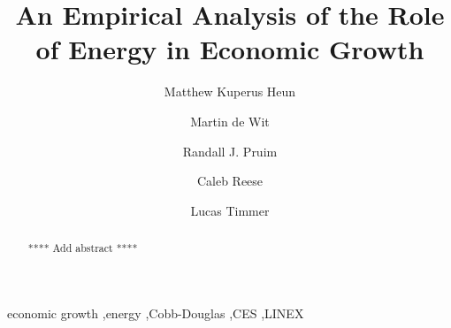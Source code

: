 \documentclass[preprint,authoryear,12pt]{elsarticle}\usepackage[]{graphicx}\usepackage[]{color}
\begin{document}
\begin{frontmatter}



\title{An Empirical Analysis of the Role of Energy in Economic Growth}


\author[CalvinEngr]{Matthew Kuperus Heun}
\author[Stellenbosch]{Martin de Wit}
\author[CalvinMath]{Randall J. Pruim}
\author[CalvinEngr]{Caleb Reese}
\author[CalvinEngr]{Lucas Timmer}

\address[CalvinEngr]{Engineering Department, Calvin College, Grand Rapids, MI 49546, USA}
\address[Stellenbosch]{Faculty of Economics and Management Sciences, School of Public Leadership, Stellenbosch University, P.O. Box 610, Bellville 7535, South Africa}
\address[CalvinMath]{Mathematics \& Statistics Department, Calvin College, Grand Rapids, MI 49546, USA}

\begin{abstract}
**** Add abstract ****
\end{abstract}

\begin{keyword}
economic growth \sep energy \sep Cobb-Douglas \sep CES \sep LINEX
\end{keyword}

\end{frontmatter}
\end{document}
